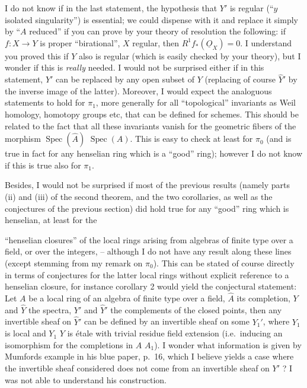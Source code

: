 \documentclass[11pt,a4paper]{article}
\begin{document}
I do not know if in the last statement, the hypothesis that $Y'$ is regular
(“$y$ isolated singularity”) is essential; we could dispense with it
\struck{\ill{}} and replace it simply by “$A$ reduced” if you can prove by
your theory of resolution the following: if $f\colon X \to Y$ is proper
“birational”, $X$ regular, then $R^1 f_*(\underline{O}_X) = 0$. I understand
you proved this if $Y$ also is regular (which is easily checked by your
theory), but I wonder if this is \emph{really} needed.
I would not be surprised either if in this statement, $Y'$ can be replaced by
any open subset of $Y$ (replacing of course $\hat{Y}'$ by the inverse image of
the latter). Moreover, I would expect the analoguous statements to hold for
$\pi_1$, more generally for all “topological” invariants as Weil homology,
homotopy groups etc, that can be defined for schemes. This should be related
to the fact that all these invariants vanish for the geometric fibers of the
morphism $\operatorname{Spec}(\hat{A})$ \supplied{$\to$}
$\operatorname{Spec}(A)$. This is easy to check at least for $\pi_0$ (and is
true in fact for any henselian ring which is a “good” ring); however I do not
know if this is true also for $\pi_1$.

Besides, I would not be surprised if most of the previous results (namely
parts (ii) and (iii) of the second theorem, and the two corollaries, as well
as the  conjectures of the previous section) did hold true for
any “good” ring which is henselian,  at least for the

“henselian closures” of the local rings arising from algebras of finite type
over a field, or over the integers, -- although I do not have any result along
these lines (except  stemming from my remark on $\pi_0$).
\struck{\ill{}} This can be stated of course directly in terms of conjectures
for the latter local rings without explicit reference to a henselian closure,
for instance corollary 2 would yield the conjectural statement: Let $A$ be a
local \struck{\ill{}} ring of an algebra of finite type over a field, $\hat{A}$
its completion, $Y$ and $\hat{Y}$ the spectra, $Y'$ and $\hat{Y}'$ the
complements of the closed points, then any invertible sheaf on $\hat{Y}'$ can
be defined by an invertible sheaf on some $Y_1'$, where $Y_1$ is local and
$Y_1$ \supplied{$\to$} $Y$ is étale with trivial residue field extension (i.e.\
inducing an isomorphism for the completions in $A$ \supplied{$\to$} $A_1$). I
wonder what information is given by Mumfords example in his blue paper, p.~16,
which I believe yields a case where the invertible sheaf considered does not
come from an invertible sheaf on $Y'$ ? I was not able to understand his
construction.
\end{document}
